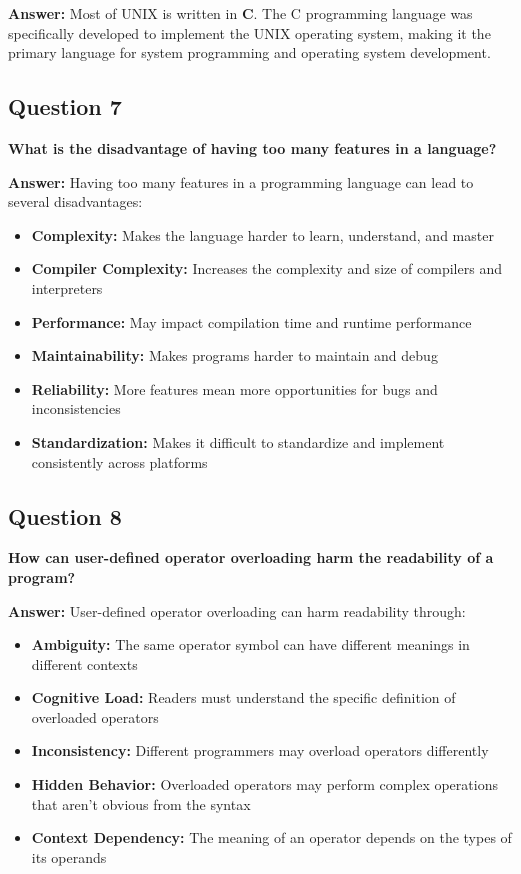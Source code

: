 \documentclass[11pt,a4paper]{article}
\begin{document}
\textbf{Answer:}
Most of UNIX is written in \textbf{C}. The C programming language was specifically developed to implement the UNIX operating system, making it the primary language for system programming and operating system development.

\subsection{Question 7}
\textbf{What is the disadvantage of having too many features in a language?}

\textbf{Answer:}
Having too many features in a programming language can lead to several disadvantages:

\begin{itemize}
\item \textbf{Complexity:} Makes the language harder to learn, understand, and master
\item \textbf{Compiler Complexity:} Increases the complexity and size of compilers and interpreters
\item \textbf{Performance:} May impact compilation time and runtime performance
\item \textbf{Maintainability:} Makes programs harder to maintain and debug
\item \textbf{Reliability:} More features mean more opportunities for bugs and inconsistencies
\item \textbf{Standardization:} Makes it difficult to standardize and implement consistently across platforms
\end{itemize}

\subsection{Question 8}
\textbf{How can user-defined operator overloading harm the readability of a program?}

\textbf{Answer:}
User-defined operator overloading can harm readability through:

\begin{itemize}
\item \textbf{Ambiguity:} The same operator symbol can have different meanings in different contexts
\item \textbf{Cognitive Load:} Readers must understand the specific definition of overloaded operators
\item \textbf{Inconsistency:} Different programmers may overload operators differently
\item \textbf{Hidden Behavior:} Overloaded operators may perform complex operations that aren't obvious from the syntax
\item \textbf{Context Dependency:} The meaning of an operator depends on the types of its operands
\end{itemize}
\end{document}
